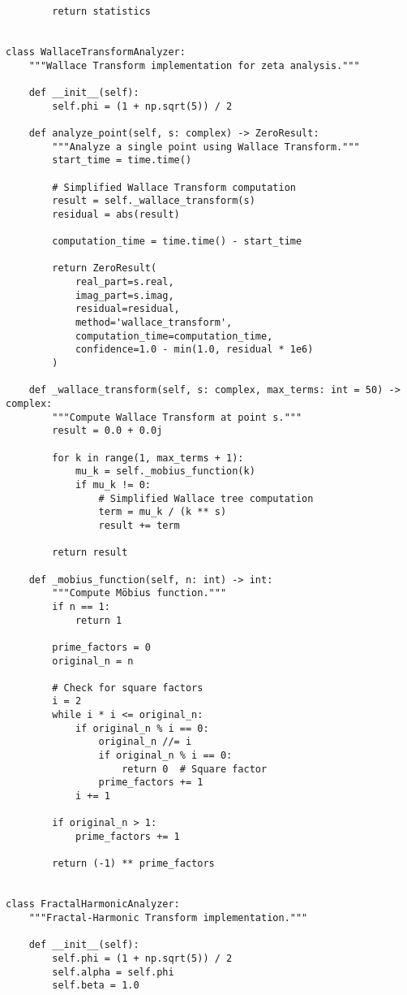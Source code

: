\documentclass[12pt]{article}
\begin{document}
\begin{lstlisting}
        return statistics


class WallaceTransformAnalyzer:
    """Wallace Transform implementation for zeta analysis."""

    def __init__(self):
        self.phi = (1 + np.sqrt(5)) / 2

    def analyze_point(self, s: complex) -> ZeroResult:
        """Analyze a single point using Wallace Transform."""
        start_time = time.time()

        # Simplified Wallace Transform computation
        result = self._wallace_transform(s)
        residual = abs(result)

        computation_time = time.time() - start_time

        return ZeroResult(
            real_part=s.real,
            imag_part=s.imag,
            residual=residual,
            method='wallace_transform',
            computation_time=computation_time,
            confidence=1.0 - min(1.0, residual * 1e6)
        )

    def _wallace_transform(self, s: complex, max_terms: int = 50) -> complex:
        """Compute Wallace Transform at point s."""
        result = 0.0 + 0.0j

        for k in range(1, max_terms + 1):
            mu_k = self._mobius_function(k)
            if mu_k != 0:
                # Simplified Wallace tree computation
                term = mu_k / (k ** s)
                result += term

        return result

    def _mobius_function(self, n: int) -> int:
        """Compute Möbius function."""
        if n == 1:
            return 1

        prime_factors = 0
        original_n = n

        # Check for square factors
        i = 2
        while i * i <= original_n:
            if original_n % i == 0:
                original_n //= i
                if original_n % i == 0:
                    return 0  # Square factor
                prime_factors += 1
            i += 1

        if original_n > 1:
            prime_factors += 1

        return (-1) ** prime_factors


class FractalHarmonicAnalyzer:
    """Fractal-Harmonic Transform implementation."""

    def __init__(self):
        self.phi = (1 + np.sqrt(5)) / 2
        self.alpha = self.phi
        self.beta = 1.0


\end{lstlisting}
\end{document}
